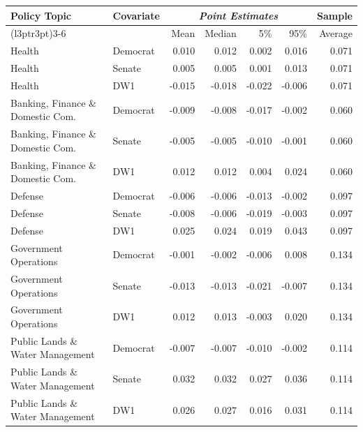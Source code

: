 

\begin{tabular}{llrrrrr}
\toprule
\multirow{2}{*}{Policy Topic} & \multirow{2}{*}{Covariate} & \multicolumn{4}{c}{\textit{Point Estimates}} & Sample \\
\cmidrule(l{3pt}r{3pt}){3-6}
& & Mean & Median & 5\% & 95\% & Average\\
\midrule
Health & Democrat & 0.010 & 0.012 & 0.002 & 0.016 & 0.071\\
Health & Senate & 0.005 & 0.005 & 0.001 & 0.013 & 0.071\\
Health & DW1 & -0.015 & -0.018 & -0.022 & -0.006 & 0.071\\
\midrule
Banking, Finance \& Domestic Com. & Democrat & -0.009 & -0.008 & -0.017 & -0.002 & 0.060\\
Banking, Finance \& Domestic Com. & Senate & -0.005 & -0.005 & -0.010 & -0.001 & 0.060\\
Banking, Finance \& Domestic Com. & DW1 & 0.012 & 0.012 & 0.004 & 0.024 & 0.060\\
\midrule
Defense & Democrat & -0.006 & -0.006 & -0.013 & -0.002 & 0.097\\
Defense & Senate & -0.008 & -0.006 & -0.019 & -0.003 & 0.097\\
Defense & DW1 & 0.025 & 0.024 & 0.019 & 0.043 & 0.097\\
\midrule
Government Operations & Democrat & -0.001 & -0.002 & -0.006 & 0.008 & 0.134\\
Government Operations & Senate & -0.013 & -0.013 & -0.021 & -0.007 & 0.134\\
Government Operations & DW1 & 0.012 & 0.013 & -0.003 & 0.020 & 0.134\\
\midrule
Public Lands \& Water Management & Democrat & -0.007 & -0.007 & -0.010 & -0.002 & 0.114\\
Public Lands \& Water Management & Senate & 0.032 & 0.032 & 0.027 & 0.036 & 0.114\\
Public Lands \& Water Management & DW1 & 0.026 & 0.027 & 0.016 & 0.031 & 0.114\\
\bottomrule
\end{tabular}

